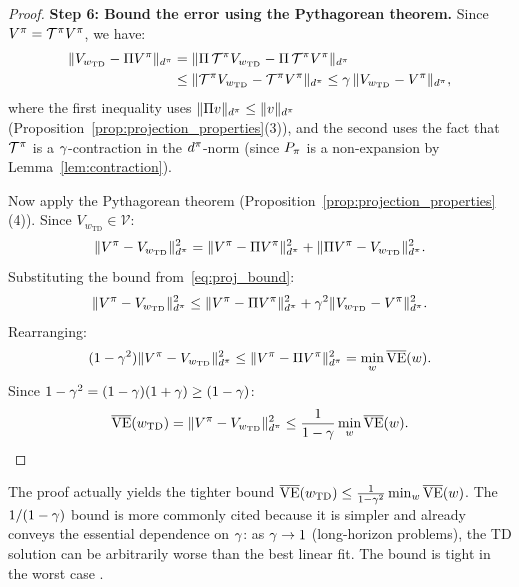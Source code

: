 \documentclass[11pt,a4paper]{article}
\begin{document}
\begin{proof}
\textbf{Step 6: Bound the error using the Pythagorean theorem.}
Since $V^\pi = \mathcal{T}^\pi V^\pi$, we have:
\begin{align}
  \|V_{w_\mathrm{TD}} - \Pi V^\pi\|_{d^\pi}
  &= \|\Pi\,\mathcal{T}^\pi V_{w_\mathrm{TD}}
     - \Pi\,\mathcal{T}^\pi V^\pi\|_{d^\pi}
     \nonumber\\
  &\leq \|\mathcal{T}^\pi V_{w_\mathrm{TD}}
     - \mathcal{T}^\pi V^\pi\|_{d^\pi}
  \leq \gamma\,\|V_{w_\mathrm{TD}} - V^\pi\|_{d^\pi},
  \label{eq:proj_bound}
\end{align}
where the first inequality uses $\|\Pi v\|_{d^\pi} \leq
\|v\|_{d^\pi}$ (Proposition~\ref{prop:projection_properties}(3)),
and the second uses the fact that $\mathcal{T}^\pi$ is a
$\gamma$-contraction in the $d^\pi$-norm (since $P_\pi$ is
a non-expansion by Lemma~\ref{lem:contraction}).

Now apply the Pythagorean theorem
(Proposition~\ref{prop:projection_properties}(4)). Since
$V_{w_\mathrm{TD}} \in \mathcal{V}$:
\begin{equation}
  \|V^\pi - V_{w_\mathrm{TD}}\|_{d^\pi}^2
  = \|V^\pi - \Pi V^\pi\|_{d^\pi}^2
  + \|\Pi V^\pi - V_{w_\mathrm{TD}}\|_{d^\pi}^2.
  \label{eq:pythag}
\end{equation}
Substituting the bound from~\eqref{eq:proj_bound}:
\begin{equation}
  \|V^\pi - V_{w_\mathrm{TD}}\|_{d^\pi}^2
  \leq \|V^\pi - \Pi V^\pi\|_{d^\pi}^2
  + \gamma^2\|V_{w_\mathrm{TD}} - V^\pi\|_{d^\pi}^2.
\end{equation}
Rearranging:
\begin{equation}
  (1 - \gamma^2)\|V^\pi - V_{w_\mathrm{TD}}\|_{d^\pi}^2
  \leq \|V^\pi - \Pi V^\pi\|_{d^\pi}^2
  = \min_w \overline{\mathrm{VE}}(w).
\end{equation}
Since $1 - \gamma^2 = (1-\gamma)(1+\gamma) \geq (1-\gamma)$:
\begin{equation}
  \overline{\mathrm{VE}}(w_{\mathrm{TD}})
  = \|V^\pi - V_{w_\mathrm{TD}}\|_{d^\pi}^2
  \leq \frac{1}{1-\gamma}\min_w \overline{\mathrm{VE}}(w).
  \qedhere
\end{equation}
\end{proof}

\begin{remark}
\label{rem:tighter}
The proof actually yields the tighter bound
$\overline{\mathrm{VE}}(w_{\mathrm{TD}}) \leq
\frac{1}{1-\gamma^2}\min_w \overline{\mathrm{VE}}(w)$. The
$1/(1-\gamma)$ bound is more commonly cited because it is simpler
and already conveys the essential dependence on $\gamma$: as
$\gamma \to 1$ (long-horizon problems), the TD solution can be
arbitrarily worse than the best linear fit. The bound is tight in the
worst case \citep{tsitsiklis1997}.
\end{remark}
\end{document}
